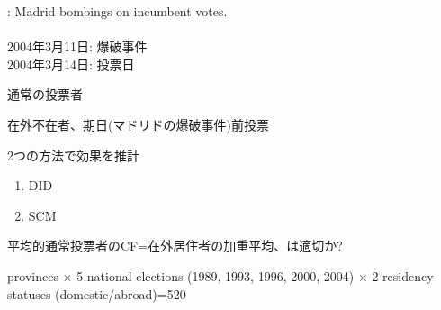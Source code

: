 \begin{frame}{}
\citet{Montalvo2011}: Madrid bombings on incumbent votes.\\~\\
2004年3月11日: 爆破事件\\
2004年3月14日: 投票日
\begin{description}
\vspace{1.0ex}\setlength{\itemsep}{1.0ex}\setlength{\baselineskip}{12pt}
\pause
\item[治療群]	通常の投票者
\pause
\item[統御群]	在外不在者、期日(マドリドの爆破事件)前投票
\end{description}
\vspace{2ex}
\pause
2つの方法で効果を推計
\begin{enumerate}
\vspace{1.0ex}\setlength{\itemsep}{1.0ex}\setlength{\baselineskip}{12pt}
\item	DID
\item	SCM
\end{enumerate}

\vspace{1ex}
\pause
\begin{dinglist}{43}
\vspace{1.0ex}\setlength{\itemsep}{1.0ex}\setlength{\baselineskip}{12pt}
\item	平均的通常投票者のCF=在外居住者の加重平均、は適切か?
\end{dinglist}
\vspace*{2ex}
 provinces $\times$ 5 national elections (1989, 1993, 1996, 2000, 2004) $\times$ 2 residency statuses (domestic/abroad)=520
\end{frame}
